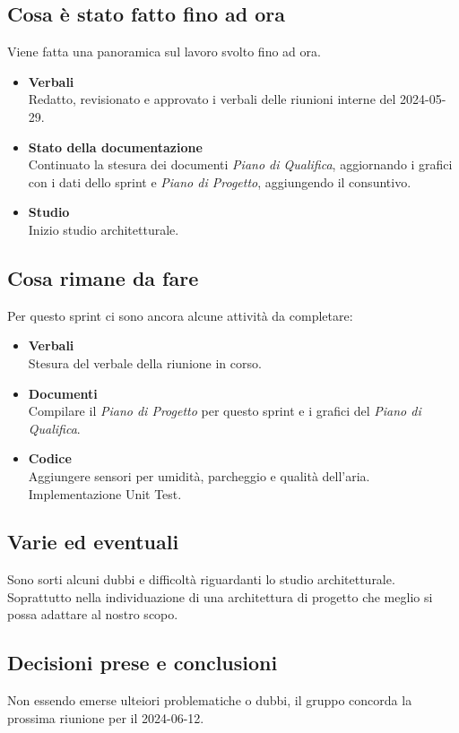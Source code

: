 \documentclass[italian,12pt]{article}
\begin{document}
\subsection{Cosa è stato fatto fino ad ora}
Viene fatta una panoramica sul lavoro svolto fino ad ora.
\begin{itemize}
	\item \textbf{Verbali} \\
		  Redatto, revisionato e approvato i verbali delle riunioni interne del 2024-05-29.
	\item \textbf{Stato della documentazione} \\
		  Continuato la stesura dei documenti \textit{Piano di Qualifica}, aggiornando i grafici con i dati dello sprint e \textit{Piano di Progetto}, aggiungendo il consuntivo.
	\item \textbf{Studio} \\
		  Inizio studio architetturale.
\end{itemize}

\subsection{Cosa rimane da fare}
Per questo sprint ci sono ancora alcune attività da completare:
\begin{itemize}
	\item \textbf{Verbali} \\
		  Stesura del verbale della riunione in corso.
	\item \textbf{Documenti} \\
		  Compilare il \textit{Piano di Progetto} per questo sprint e i grafici del \textit{Piano di Qualifica}.
	\item \textbf{Codice} \\
		  Aggiungere sensori per umidità, parcheggio e qualità dell'aria. Implementazione Unit Test.
\end{itemize}

\subsection{Varie ed eventuali}
Sono sorti alcuni dubbi e difficoltà riguardanti lo studio architetturale. Soprattutto nella individuazione di una architettura di progetto che meglio si possa adattare al nostro scopo.

\subsection{Decisioni prese e conclusioni}
Non essendo emerse ulteiori problematiche o dubbi, il gruppo concorda la prossima riunione per il 2024-06-12.
\end{document}
